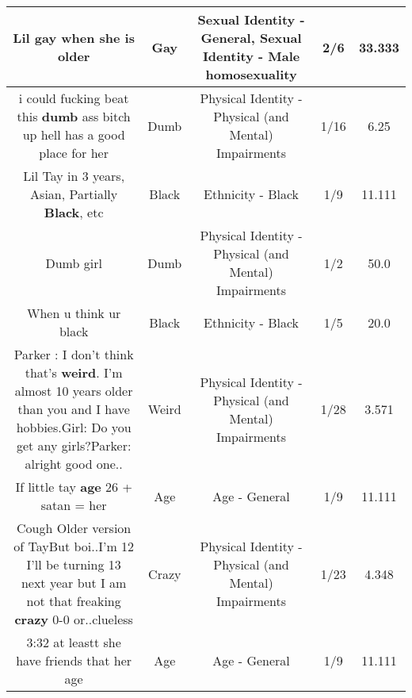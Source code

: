 \documentclass[11pt]{article}
\newlength\mylength
\begin{document}
\begin{center}
\begin{longtable}{|C{.65\mylength}|C{.30\mylength}|C{.12\mylength}|C{.12\mylength}|C{.12\mylength}|}
  \small Lil \textbf{g\textbf{ay}} when she is older\normalsize   & Gay & Sexual Identity - General, Sexual Identity - Male homosexuality & 2/6 & 33.333 \\  \hline
  \small i could fucking beat this \textbf{dumb} ass bitch up hell has a good place for her\normalsize   & Dumb & Physical Identity - Physical (and Mental) Impairments & 1/16 & 6.25 \\  \hline
  \small Lil Tay in 3 years, Asian, Partially \textbf{Black}, etc\normalsize   & Black & Ethnicity - Black & 1/9 & 11.111 \\  \hline
  \small Dumb girl\normalsize   & Dumb & Physical Identity - Physical (and Mental) Impairments & 1/2 & 50.0 \\  \hline
  \small When u think ur black\normalsize   & Black & Ethnicity - Black & 1/5 & 20.0 \\  \hline
  \small Parker : I don't think that's \textbf{weird}. I'm almost 10 years older than you and I have hobbies.Girl: Do you get any girls?Parker: alright good one..\normalsize   & Weird & Physical Identity - Physical (and Mental) Impairments & 1/28 & 3.571 \\  \hline
  \small If little tay \textbf{age} 26 + satan = her\normalsize   & Age & Age - General & 1/9 & 11.111 \\  \hline
  \small Cough Older version of TayBut boi..I'm 12 I'll be turning 13 next year but I am not that freaking \textbf{crazy} 0-0 or..clueless\normalsize   & Crazy & Physical Identity - Physical (and Mental) Impairments & 1/23 & 4.348 \\  \hline
  \small 3:32 at leastt she have friends that her age\normalsize   & Age & Age - General & 1/9 & 11.111 \\  \hline

\end{longtable}
\end{center}
\end{document}
